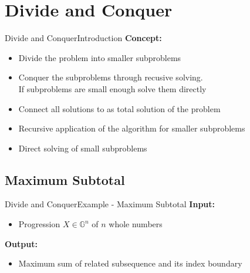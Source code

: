 \section{Divide and Conquer}


\begin{frame}{Divide and Conquer}{Introduction}
  \textbf{Concept:}
  \begin{itemize}
    \item
      {\color{Mittel-Blau}Divide} the problem into smaller subproblems
    \item
      {\color{Mittel-Blau}Conquer} the subproblems through recusive solving.\\
      If subproblems are small enough solve them directly
    \item
      {\color{Mittel-Blau}Connect} all solutions to as total solution of the
      problem
  \end{itemize}
  \vspace{1.0em}
  \begin{itemize}
    \item
      {\color{Mittel-Blau}Recursive} application of the algorithm for smaller
      subproblems
    \item
      {\color{Mittel-Blau}Direct} solving of small subproblems
  \end{itemize}
\end{frame}


\subsection{Maximum Subtotal}

\begin{frame}{Divide and Conquer}{Example - Maximum Subtotal}
  \textbf{Input:}
  \begin{itemize}
    \item
      Progression $X \in \mathbb{G}^n$ of $n$ whole numbers
  \end{itemize}
  \textbf{Output:}
  \begin{itemize}
    \item
      Maximum sum of related subsequence and its index boundary
  \end{itemize}
\end{frame}

